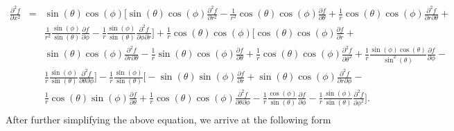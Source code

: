 \documentclass[12pt]{article}
\begin{document}
\begin{eqnarray*}
\frac{{\partial}^2 f}{\partial x^2} &=& \sin(\theta)\cos(\phi)\Big[\sin(\theta)\cos(\phi)\frac{{\partial}^2 f}{\partial r^2} - \frac{1}{r^2}\cos(\theta)\cos(\phi)\frac{\partial f}{\partial\theta} + \frac{1}{r}\cos(\theta)\cos(\phi)\frac{{\partial}^2 f}{\partial r \partial\theta} + \\
& & \frac{1}{r^2}\frac{\sin(\phi)}{\sin(\theta)}\frac{\partial f}{\partial\phi} - \frac{1}{r}\frac{\sin(\phi)}{\sin(\theta)}\frac{{\partial}^2 f}{\partial\phi\partial r}\Big] + \frac{1}{r}\cos(\theta)\cos(\phi)\Big[\cos(\theta)\cos(\phi)\frac{\partial f}{\partial r} + \\
& & \sin(\theta)\cos(\phi)\frac{{\partial}^2 f}{\partial r\partial\theta} - \frac{1}{r}\sin(\theta)\cos(\phi)\frac{\partial f}{\partial\theta} + \frac{1}{r}\cos(\theta)\cos(\phi)\frac{{\partial}^2 f}{\partial{\theta}^2} + \frac{1}{r}\frac{\sin(\phi)\cos(\theta)}{{\sin}^2(\theta)}\frac{\partial f}{\partial\phi} - \\
& & \frac{1}{r}\frac{\sin(\phi)}{\sin(\theta)}\frac{{\partial}^2 f}{\partial\theta\partial\phi}\Big] - \frac{1}{r}\frac{\sin(\phi)}{\sin(\theta)}\Big[-\sin(\theta)\sin(\phi)\frac{\partial f}{\partial r} + \sin(\theta)\cos(\phi)\frac{{\partial}^2 f}{\partial r\partial\phi} - \\
& & \frac{1}{r}\cos(\theta)\sin(\phi)\frac{\partial f}{\partial\theta} + \frac{1}{r}\cos(\theta)\cos(\phi)\frac{{\partial}^2 f}{\partial\theta \partial\phi} - \frac{1}{r}\frac{\cos(\phi)}{\sin(\theta)}\frac{\partial f}{\partial\phi} - \frac{1}{r}\frac{\sin(\phi)}{\sin(\theta)}\frac{{\partial}^2 f}{\partial{\phi}^2}\Big].\\
\end{eqnarray*}
After further simplifying the above equation, we arrive at the following form 
\end{document}
